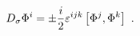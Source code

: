 \begin{equation}
D_\sigma \Phi^i=\pm {i\over2}\varepsilon^{ijk}\left[\Phi^j,
\Phi^k\right]\ .\label{nahmeq}
\end{equation}

